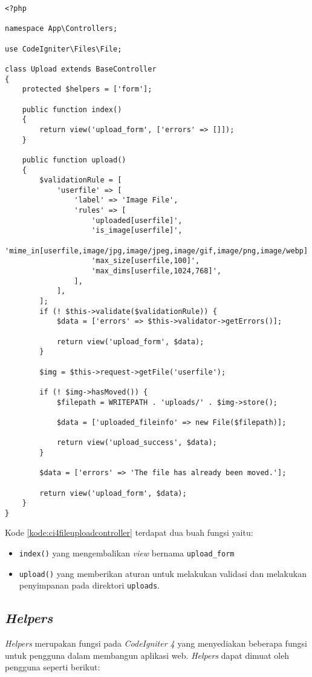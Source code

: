 \begin{lstlisting}[caption=Contoh kode \textit{controller} untuk melakukan validasi dan penyimpanan. ,label=kode:ci4fileuploadcontroller]
<?php

namespace App\Controllers;

use CodeIgniter\Files\File;

class Upload extends BaseController
{
    protected $helpers = ['form'];

    public function index()
    {
        return view('upload_form', ['errors' => []]);
    }

    public function upload()
    {
        $validationRule = [
            'userfile' => [
                'label' => 'Image File',
                'rules' => [
                    'uploaded[userfile]',
                    'is_image[userfile]',
                    'mime_in[userfile,image/jpg,image/jpeg,image/gif,image/png,image/webp]',
                    'max_size[userfile,100]',
                    'max_dims[userfile,1024,768]',
                ],
            ],
        ];
        if (! $this->validate($validationRule)) {
            $data = ['errors' => $this->validator->getErrors()];

            return view('upload_form', $data);
        }

        $img = $this->request->getFile('userfile');

        if (! $img->hasMoved()) {
            $filepath = WRITEPATH . 'uploads/' . $img->store();

            $data = ['uploaded_fileinfo' => new File($filepath)];

            return view('upload_success', $data);
        }

        $data = ['errors' => 'The file has already been moved.'];

        return view('upload_form', $data);
    }
}
\end{lstlisting}
Kode \ref{kode:ci4fileuploadcontroller} terdapat dua buah fungsi yaitu:
\begin{itemize}
\item \verb|index()| yang mengembalikan \textit{view} bernama \texttt{upload\_form}
\item \verb|upload()| yang memberikan aturan untuk melakukan validasi dan melakukan penyimpanan pada direktori \texttt{uploads}.
\end{itemize}

\subsection{\textit{Helpers}}
\textit{Helpers} merupakan fungsi pada \textit{CodeIgniter 4} yang menyediakan beberapa fungsi untuk pengguna dalam membangun aplikasi web. \textit{Helpers} dapat dimuat oleh pengguna seperti berikut:

